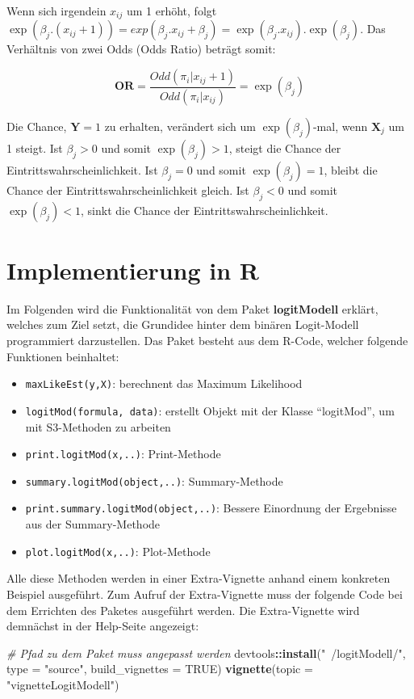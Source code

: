\documentclass[12pt,]{article}
\newenvironment{Shaded}{\begin{snugshade}}{\end{snugshade}}
\newcommand{\KeywordTok}[1]{\textcolor[rgb]{0.13,0.29,0.53}{\textbf{#1}}}
\newcommand{\DataTypeTok}[1]{\textcolor[rgb]{0.13,0.29,0.53}{#1}}
\newcommand{\StringTok}[1]{\textcolor[rgb]{0.31,0.60,0.02}{#1}}
\newcommand{\CommentTok}[1]{\textcolor[rgb]{0.56,0.35,0.01}{\textit{#1}}}
\newcommand{\OtherTok}[1]{\textcolor[rgb]{0.56,0.35,0.01}{#1}}
\newcommand{\OperatorTok}[1]{\textcolor[rgb]{0.81,0.36,0.00}{\textbf{#1}}}
\newcommand{\NormalTok}[1]{#1}
\providecommand{\tightlist}{%
  \setlength{\itemsep}{0pt}\setlength{\parskip}{0pt}}
\begin{document}
Wenn sich irgendein \(x_{ij}\) um 1 erhöht, folgt
\(\exp(\beta_j.(x_{ij}+1)) = exp(\beta_j.x_{ij}+\beta_j) = \exp(\beta_j.x_{ij}).\exp(\beta_j)\).
Das Verhältnis von zwei Odds (Odds Ratio) beträgt somit:

\[
\mathbf{OR} = \frac{Odd(\pi_i|x_{ij}+1)}{Odd(\pi_i|x_{ij})} = \exp(\beta_j)
\]

Die Chance, \(\mathbf{Y} = 1\) zu erhalten, verändert sich um
\(\exp(\beta_j)\)-mal, wenn \(\mathbf{X}_j\) um 1 steigt. Ist
\(\beta_j > 0\) und somit \(\exp(\beta_j) > 1\), steigt die Chance der
Eintrittswahrscheinlichkeit. Ist \(\beta_j = 0\) und somit
\(\exp(\beta_j) = 1\), bleibt die Chance der Eintrittswahrscheinlichkeit
gleich. Ist \(\beta_j < 0\) und somit \(\exp(\beta_j) < 1\), sinkt die
Chance der Eintrittswahrscheinlichkeit.

\section{Implementierung in R}\label{implementierung-in-r}

Im Folgenden wird die Funktionalität von dem Paket \textbf{logitModell}
erklärt, welches zum Ziel setzt, die Grundidee hinter dem binären
Logit-Modell programmiert darzustellen. Das Paket besteht aus dem
R-Code, welcher folgende Funktionen beinhaltet:

\begin{itemize}
\tightlist
\item
  \texttt{maxLikeEst(y,X)}: berechnent das Maximum Likelihood
\item
  \texttt{logitMod(formula,\ data)}: erstellt Objekt mit der Klasse
  ``logitMod'', um mit S3-Methoden zu arbeiten
\item
  \texttt{print.logitMod(x,..)}: Print-Methode
\item
  \texttt{summary.logitMod(object,..)}: Summary-Methode
\item
  \texttt{print.summary.logitMod(object,..)}: Bessere Einordnung der
  Ergebnisse aus der Summary-Methode
\item
  \texttt{plot.logitMod(x,..)}: Plot-Methode
\end{itemize}

Alle diese Methoden werden in einer Extra-Vignette anhand einem
konkreten Beispiel ausgeführt. Zum Aufruf der Extra-Vignette muss der
folgende Code bei dem Errichten des Paketes ausgeführt werden. Die
Extra-Vignette wird demnächst in der Help-Seite angezeigt:

\begin{Shaded}
\begin{Highlighting}[]
\CommentTok{# Pfad zu dem Paket muss angepasst werden}
\NormalTok{devtools}\OperatorTok{::}\KeywordTok{install}\NormalTok{(}\StringTok{"~/logitModell/"}\NormalTok{, }
                  \DataTypeTok{type =} \StringTok{"source"}\NormalTok{, }\DataTypeTok{build_vignettes =} \OtherTok{TRUE}\NormalTok{)}
\KeywordTok{vignette}\NormalTok{(}\DataTypeTok{topic =} \StringTok{"vignetteLogitModell"}\NormalTok{)}
\end{Highlighting}
\end{Shaded}
\end{document}
